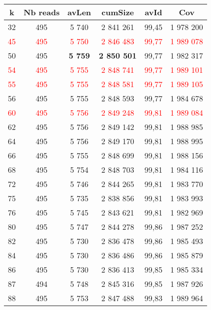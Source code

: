 \documentclass[12pt]{article}
\begin{document}
\begin{tabular}{|c|c|c|c|c|c|}
	\hline
	k & Nb reads & avLen & cumSize & avId & Cov \\
	\hline
	32 & 495 & 5 740 & 2 841 261 & 99,45 & 1 978 200 \\
	\hline 
	\textcolor{red}{45} & \textcolor{red}{495} & \textcolor{red}{5 750} & \textcolor{red}{2 846 483} & \textcolor{red}{99,77} & \textcolor{red}{1 989 078} \\
	\hline
	50 & 495 & \textbf{5 759} & \textbf{2 850 501} & 99,77 & 1 982 317 \\
	\hline
	\textcolor{red}{54} & \textcolor{red}{495} & \textcolor{red}{5 755} & \textcolor{red}{2 848 741} & \textcolor{red}{99,77} & \textcolor{red}{1 989 101} \\
	\hline
	\textcolor{red}{55} & \textcolor{red}{495} & \textcolor{red}{5 755} & \textcolor{red}{2 848 581} & \textcolor{red}{99,77} & \textcolor{red}{1 989 105} \\
	\hline
	56 & 495 & 5 755 & 2 848 593 & 99,77 & 1 984 678 \\
	\hline
	\textcolor{red}{60} & \textcolor{red}{495} & \textcolor{red}{5 756} & \textcolor{red}{2 849 248} & \textcolor{red}{99,81} & \textcolor{red}{1 989 084} \\
	\hline
	62 & 495 & 5 756 & 2 849 142 & 99,81 & 1 988 985 \\
	\hline
	64 & 495 & 5 756 & 2 849 170 & 99,81 & 1 988 995 \\
	\hline
	66 & 495 & 5 755 & 2 848 699 & 99,81 & 1 988 156 \\
	\hline
	68 & 495 & 5 754 & 2 848 703 & 99,81 & 1 984 116 \\
	\hline
	72 & 495 & 5 746 & 2 844 265 & 99,81 & 1 983 770 \\
	\hline
	75 & 495 & 5 735 & 2 838 856 & 99,81 & 1 983 993 \\
	\hline
	76 & 495 & 5 745 & 2 843 621 & 99,81 & 1 982 969 \\
	\hline
	80 & 495 & 5 747 & 2 844 278 & 99,86 & 1 987 252 \\
	\hline
	82 & 495 & 5 730 & 2 836 478 & 99,86 & 1 985 493 \\
	\hline
	84 & 495 & 5 730 & 2 836 486 & 99,86 & 1 985 879 \\
	\hline
	86 & 495 & 5 730 & 2 836 413 & 99,85 & 1 985 334 \\
	\hline	
	87 & 494 & 5 748 & 2 845 316 & 99,85 & 1 987 926 \\
	\hline
	88 & 495 & 5 753 & 2 847 488 & 99,83 & 1 989 964 \\

\end{tabular}
\end{document}
